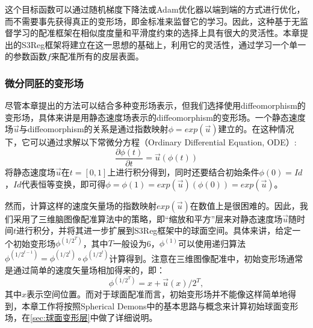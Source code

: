 这个目标函数可以通过随机梯度下降法或Adam优化器\cite{kingma2014adam}以端到端的方式进行优化，而不需要事先获得真正的变形场，即金标准来监督它的学习。因此，这种基于无监督学习的配准框架在相似度度量和平滑度约束的选择上具有很大的灵活性。本章提出的S3Reg框架将建立在这一思想的基础上，利用它的灵活性，通过学习一个单一的参数函数$f$来配准所有的皮层表面。

\subsubsection{微分同胚的变形场}\label{sec:微分同胚的变形场}
尽管本章提出的方法可以结合多种变形场表示，但我们选择使用diffeomorphism的变形场，具体来讲是用静态速度场表示的diffeomorphism的变形场。一个静态速度场$\overrightarrow{u}$与diffeomorphism的关系是通过指数映射$\phi=exp(\overrightarrow{u})$建立的。在这种情况下，它可以通过求解以下常微分方程（Ordinary Differential Equation, ODE）:
\begin{equation}
{\frac{\partial \phi(t)}{\partial t} }=\overrightarrow{u}(\phi(t))
\end{equation}
将静态速度场$\overrightarrow{u}$在$t=[0,1]$上进行积分得到，同时还要结合初始条件$\phi(0)=Id$，$Id$代表恒等变换，即可得$\phi=\phi(1)=exp(\overrightarrow{u})(\phi(0))=exp(\overrightarrow{u})$。

然而，计算这样的速度矢量场的指数映射$exp(\overrightarrow{u})$在数值上是很困难的。因此，我们采用了三维脑图像配准算法中的策略\cite{dalca2018unsupervised,krebs2019learning}，即“缩放和平方”层\cite{arsigny2006log}来对静态速度场$\overrightarrow{u}$随时间$t$进行积分，并将其进一步扩展到S3Reg框架中的球面空间。具体来讲，给定一个初始变形场$\phi^{(1/2^T)}$，其中$T$一般设为6，$\phi^{(1)}$可以使用递归算法$\phi^{(1/2^{t-1})}=\phi^{(1/2^t)}\circ\phi^{(1/2^t)}$计算得到。注意在三维图像配准中，初始变形场通常是通过简单的速度矢量场相加得来的，即：
\begin{equation}
\phi^{(1/2^T)}=x+\overrightarrow{u}(x)/2^T,
\end{equation}
其中$x$表示空间位置。而对于球面配准而言，初始变形场并不能像这样简单地得到，本章工作将按照Spherical Demons中的基本思路与概念\cite{yeo2009spherical}来计算初始球面变形场，在\ref{sec:球面变形层}中做了详细说明。

